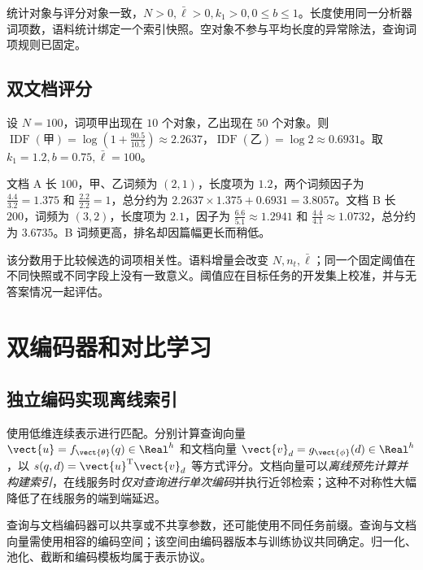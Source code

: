 \documentclass[../textbook.tex]{subfiles}
\begin{document}
\begin{assumption}[BM25 的数值解释]
统计对象与评分对象一致，$N>0,\bar\ell>0,k_1>0,0\le b\le1$。长度使用同一分析器词项数，语料统计绑定一个索引快照。空对象不参与平均长度的异常除法，查询词项规则已固定。
\end{assumption}

\subsection{双文档评分}
\begin{example}


设 $N=100$，词项甲出现在 $10$ 个对象，乙出现在 $50$ 个对象。则 $\operatorname{IDF}(\text{甲})=\log(1+\frac{90.5}{10.5})\approx2.2637$，$\operatorname{IDF}(\text{乙})=\log2\approx0.6931$。取 $k_1=1.2,b=0.75,\bar\ell=100$。

文档 A 长 $100$，甲、乙词频为 $(2,1)$，长度项为 $1.2$，两个词频因子为 $\frac{4.4}{3.2}=1.375$ 和 $\frac{2.2}{2.2}=1$，总分约为 $2.2637\times1.375+0.6931=3.8057$。文档 B 长 $200$，词频为 $(3,2)$，长度项为 $2.1$，因子为 $\frac{6.6}{5.1}\approx1.2941$ 和 $\frac{4.4}{4.1}\approx1.0732$，总分约为 $3.6735$。B 词频更高，排名却因篇幅更长而稍低。

该分数用于比较候选的词项相关性。语料增量会改变 $N,n_t,\bar\ell$；同一个固定阈值在不同快照或不同字段上没有一致意义。阈值应在目标任务的开发集上校准，并与无答案情况一起评估。
\end{example}

\section{双编码器和对比学习}

\subsection{独立编码实现离线索引}
使用低维连续表示进行匹配。分别计算查询向量 $\vect{u}=f_{\vect{\theta}}(q)\in\Real^h$ 和文档向量 $\vect{v}_d=g_{\vect{\phi}}(d)\in\Real^h$，以 $s(q,d)=\vect{u}^{\mathrm{T}}\vect{v}_d$ 等方式评分。文档向量可以\emph{离线预先计算并构建索引}，在线服务时\emph{仅对查询进行单次编码}并执行近邻检索；这种不对称性大幅降低了在线服务的端到端延迟\cite{karpukhin2020dpr}。

查询与文档编码器可以共享或不共享参数，还可能使用不同任务前缀。查询与文档向量需使用相容的编码空间；该空间由编码器版本与训练协议共同确定。归一化、池化、截断和编码模板均属于表示协议。
\end{document}
